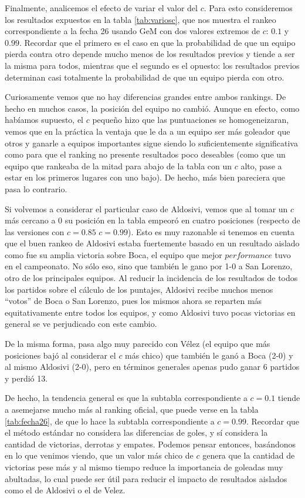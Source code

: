 Finalmente, analicemos el efecto de variar el valor del $c$. Para esto consideremos los resultados expuestos en la tabla \ref{tab:variosc}, que nos muestra el rankeo correspondiente a la fecha 26 usando GeM con dos valores extremos de $c$: $0.1$ y $0.99$. Recordar que el primero es el caso en que la probabilidad de que un equipo pierda contra otro depende mucho menos de los resultados previos y tiende a ser la misma para todos, mientras que el segundo es el opuesto: los resultados previos determinan casi totalmente la probabilidad de que un equipo pierda con otro.

Curiosamente vemos que no hay diferencias grandes entre ambos rankings. De hecho en muchos casos, la posición del equipo no cambió. Aunque en efecto, como habíamos supuesto, el $c$ pequeño hizo que las puntuaciones se homogeneizaran, vemos que en la práctica la ventaja que le da a un equipo ser más goleador que otros y ganarle a equipos importantes sigue siendo lo suficientemente significativa como para que el ranking no presente resultados poco deseables (como que un equipo que rankeaba de la mitad para abajo de la tabla con un $c$ alto, pase a estar en los primeros lugares con uno bajo). De hecho, más bien pareciera que pasa lo contrario. 

Si volvemos a considerar el particular caso de Aldosivi, vemos que al tomar un $c$ más cercano a 0 su posición en la tabla empeoró en cuatro posiciones (respecto de las versiones con $c=0.85$ $c=0.99$). Esto es muy razonable si tenemos en cuenta que el buen rankeo de Aldosivi estaba fuertemente basado en un resultado aislado como fue su amplia victoria sobre Boca, el equipo que mejor $performance$ tuvo en el campeonato. No sólo eso, sino que también le gano por 1-0 a San Lorenzo, otro de los principales equipos. Al reducir la incidencia de los resultados de todos los partidos sobre el cálculo de los puntajes, Aldosivi recibe muchos menos ``votos'' de Boca o San Lorenzo, pues los mismos ahora se reparten más equitativamente entre todos los equipos, y como Aldosivi tuvo pocas victorias en general se ve perjudicado con este cambio.

De la misma forma, pasa algo muy parecido con Vélez (el equipo que más posiciones bajó al considerar el $c$ más chico) que también le ganó a Boca (2-0) y al mismo Aldosivi (2-0), pero en términos generales apenas pudo ganar 6 partidos y perdió 13.

De hecho, la tendencia general es que la subtabla correspondiente a $c=0.1$ tiende a asemejarse mucho más al ranking oficial, que puede verse en la tabla \ref{tab:fecha26}, de que lo hace la subtabla correspondiente a $c=0.99$. Recordar que el método estándar no considera las diferencias de goles, y sí considera la cantidad de victorias, derrotas y empates. Podemos pensar entonces, basándonos en lo que venimos viendo, que un valor más chico de $c$ genera que la cantidad de victorias pese más y al mismo tiempo reduce la importancia de goleadas muy abultadas, lo cual puede ser útil para reducir el impacto de resultados aislados como el de Aldosivi o el de Velez.

